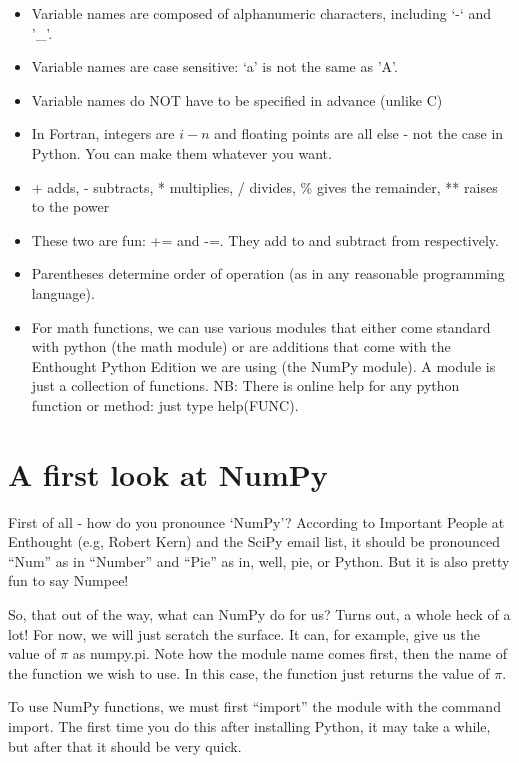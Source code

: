 \documentclass[11pt]{book}
\begin{document}
{{{\begin{itemize}
\item Variable names are composed of alphanumeric characters, including `-` and '\_'.
\item Variable names are case sensitive:  `a' is not the same as 'A'.
\item Variable names do NOT have to be specified in advance (unlike C)
\item In Fortran, integers are  $i-n$ and floating points are all else - not the case in Python. You can make them whatever you want.
\item + adds, - subtracts, * multiplies, / divides, \% gives the remainder, ** raises to the power
\item These two are fun: {\color{blue}+=} and  {\color{blue}-=}.  They add to and subtract from respectively.
\item Parentheses determine order of operation (as in any reasonable programming language).
\item  For math functions, we can use various modules that either come standard with python (the math module) or are additions that come with the Enthought Python Edition we are using (the NumPy module).  A module is just a collection of functions. NB:  There is online help for any python function or method:  just type help(FUNC).
\end{itemize}


\section{A first look at NumPy}

First of all - how do you pronounce `NumPy'?  According to Important People at Enthought (e.g, Robert Kern) and the SciPy email list, it should be pronounced ``Num'' as in ``Number'' and ``Pie'' as in, well, pie, or Python.  But it is also pretty fun to say Numpee!

So, that out of the way, what can NumPy do for us?  Turns out, a whole heck of a lot!  For now, we will just scratch the surface.   It can, for example, give us the value of $\pi$ as {\color{blue}numpy.pi}.  Note how the module name comes first, then the name of the function we wish to use.  In this case, the function just returns the value of $\pi$.

To use {\color{blue}NumPy} functions, we must first ``import'' the module with the command {\color{blue}import}.  The first time you do this after installing Python, it may take a while, but after that it should be very quick.

}}}
\end{document}
